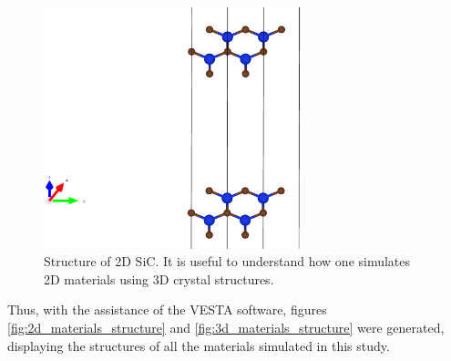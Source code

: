 \begin{figure}[!ht]
        \centering
        \includegraphics[width=\linewidth,height=7cm]{images/sic_st_bc.eps}
        \caption{Structure of 2D SiC. It is useful to understand how one simulates 2D materials using 3D crystal structures.}
        \label{fig:sic_st_bc}
\end{figure}


Thus, with the assistance of the VESTA software, figures \ref{fig:2d_materials_structure} and \ref{fig:3d_materials_structure} were generated, displaying the structures of all the materials simulated in this study.

